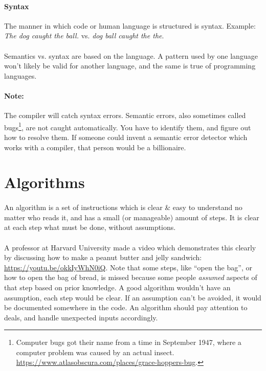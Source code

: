 \documentclass[letter,11pt]{article}
\begin{document}
\paragraph{Syntax} The manner in which code or human language is structured is syntax. Example: \textit{The dog caught the ball.} vs. \textit{dog ball caught the the}.

\paragraph{}Semantics vs. syntax are based on the language. A pattern used by one language won't likely be valid for another language, and the same is true of programming languages.

\paragraph{Note:}The compiler will catch syntax errors. Semantic errors, also sometimes called bugs\footnote{Computer bugs got their name from a time in September 1947, where a computer problem was caused by an actual insect. \url{https://www.atlasobscura.com/places/grace-hoppers-bug}.}, are not caught automatically. You have to identify them, and figure out how to resolve them. If someone could invent a semantic error detector which works with a compiler, that person would be a billionaire.

\section{Algorithms}
\paragraph{}An algorithm is a set of instructions which is clear \& easy to understand no matter who reads it, and has a small (or manageable) amount of steps. It is clear at each step what must be done, without assumptions.

\paragraph{}A professor at Harvard University made a video which demonstrates this clearly by discussing how to make a peanut butter and jelly sandwich: \url{https://youtu.be/okkIyWhN0iQ}. Note that some steps, like ``open the bag'', or how to open the bag of bread, is missed because some people \textit{assumed} aspects of that step based on prior knowledge. A good algorithm wouldn't have an assumption, each step would be clear. If an assumption can't be avoided, it would be documented somewhere in the code. An algorithm should pay attention to deals, and handle unexpected inputs accordingly.
\end{document}
